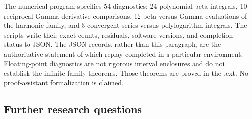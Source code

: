 \documentclass[11pt]{article}
\numberwithin{equation}{section}
\theoremstyle{definition}\newtheorem{definition}[theorem]{Definition}
\theoremstyle{remark}\newtheorem{remark}[theorem]{Remark}
\begin{document}
The numerical program specifies 54 diagnostics: 24 polynomial beta integrals, 10 reciprocal-Gamma derivative comparisons, 12 beta-versus-Gamma evaluations of the harmonic family, and 8 convergent series-versus-polylogarithm integrals. The scripts write their exact counts, residuals, software versions, and completion status to JSON. The JSON records, rather than this paragraph, are the authoritative statement of which replay completed in a particular environment. Floating-point diagnostics are not rigorous interval enclosures and do not establish the infinite-family theorems. Those theorems are proved in the text. No proof-assistant formalization is claimed.

\subsection{Further research questions}
\end{document}
